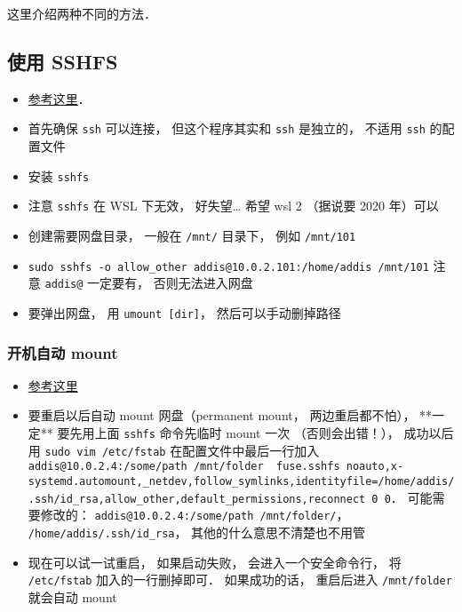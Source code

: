 
这里介绍两种不同的方法．

\subsection{使用 SSHFS}
\begin{itemize}
\item \href{https://www.digitalocean.com/community/tutorials/how-to-use-sshfs-to-mount-remote-file-systems-over-ssh}{参考这里}．
\item 首先确保 \verb`ssh` 可以连接， 但这个程序其实和 \verb`ssh` 是独立的， 不适用 \verb`ssh` 的配置文件
\item 安装 \verb`sshfs`
\item 注意 \verb`sshfs` 在 WSL 下无效， 好失望… 希望 wsl 2 （据说要 2020 年）可以
\item 创建需要网盘目录， 一般在 \verb`/mnt/` 目录下， 例如 \verb`/mnt/101`
\item \verb`sudo sshfs -o allow_other addis@10.0.2.101:/home/addis /mnt/101` 注意 \verb`addis@` 一定要有， 否则无法进入网盘
\item 要弹出网盘， 用 \verb`umount [dir]`， 然后可以手动删掉路径
\end{itemize}

\subsubsection{开机自动 mount}
\begin{itemize}
\item \href{https://www.linode.com/docs/networking/ssh/using-sshfs-on-linux/}{参考这里}
\item 要重启以后自动 mount 网盘（permanent mount， 两边重启都不怕）， **一定** 要先用上面 \verb`sshfs` 命令先临时 mount 一次 （否则会出错！）， 成功以后用 \verb`sudo vim /etc/fstab` 在配置文件中最后一行加入 \verb`addis@10.0.2.4:/some/path /mnt/folder  fuse.sshfs noauto,x-systemd.automount,_netdev,follow_symlinks,identityfile=/home/addis/.ssh/id_rsa,allow_other,default_permissions,reconnect 0 0`． 可能需要修改的： \verb`addis@10.0.2.4:/some/path /mnt/folder/`， \verb`/home/addis/.ssh/id_rsa`， 其他的什么意思不清楚也不用管
\item 现在可以试一试重启， 如果启动失败， 会进入一个安全命令行， 将 \verb`/etc/fstab` 加入的一行删掉即可． 如果成功的话， 重启后进入 \verb`/mnt/folder` 就会自动 mount
\end{itemize}

